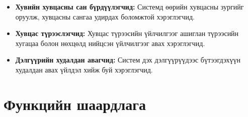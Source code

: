 \begin{itemize}
    \item \textbf{Хувийн хувцасны сан бүрдүүлэгчид:} Системд өөрийн хувцасны зургийг оруулж, хувцасны сангаа удирдах боломжтой хэрэглэгчид.
    
    \item \textbf{Хувцас түрээслэгчид:} Хувцас түрээсийн үйлчилгээг ашиглан түрээсийн хугацаа болон нөхцөлд нийцсэн үйлчилгээг авах хэрэглэгчид.
    
    \item \textbf{Дэлгүүрийн худалдан авагчид:} Систем дэх дэлгүүрүүдээс бүтээгдэхүүн худалдан авах үйлдэл хийж буй хэрэглэгчид.
\end{itemize}

\section{Функцийн шаардлага}
